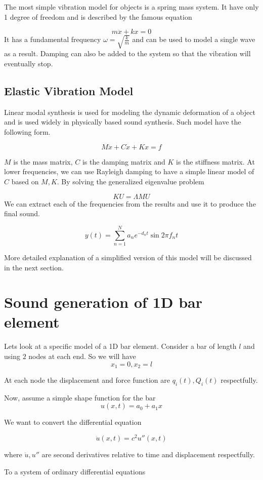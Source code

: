 \documentclass[11pt]{article}
\begin{document}
The most simple vibration model for objects is a spring mass system. It have only 1 degree of freedom and is described by the famous equation

\[
    m\ddot{x} + kx = 0
\]
It has a fundamental frequency $\omega = \sqrt{\frac{k}{m}}$ and can be used to model a single wave as a result. Damping can also be added to the system so that the vibration will eventually stop.

\subsection*{Elastic Vibration Model}
Linear modal synthesis \cite{Doel1996} is used for modeling the dynamic deformation of a object and is used widely in physically based sound synthesis. Such model have the following form.

\[
    M\ddot{x} + C\dot{x} + Kx = f
\]

$M$ is the mass matrix, $C$ is the damping matrix and $K$ is the stiffness matrix. At lower frequencies, we can use Rayleigh damping to have a simple linear model of $C$ based on $M,K$. 
By solving the generalized eigenvalue problem

\[
KU = \Lambda MU
\]
We can extract each of the frequencies from the results and use it to produce the final sound.

\[
    y(t) = \sum_{n=1}^{N}a_n e^{-d_nt}\sin{2\pi f_n t}
\]

More detailed explanation of a simplified version of this model will be discussed in the next section.

\section*{Sound generation of 1D bar element}
Lets look at a specific model of a 1D bar element. Consider a bar of length $l$ and using $2$ nodes at each end. So we will have
$$x_1 = 0, x_2 = l$$

At each node the displacement and force function are $q_i(t), Q_i(t)$ respectfully.

Now, assume a simple shape function for the bar
$$u(x,t) = a_0 + a_1x$$

We want to convert the differential equation

$$\ddot{u}(x, t) = c^2 u''(x,t)$$

where $\ddot{u},u''$ are second derivatives relative to time and displacement respectfully.

To a system of ordinary differential equations
\end{document}
